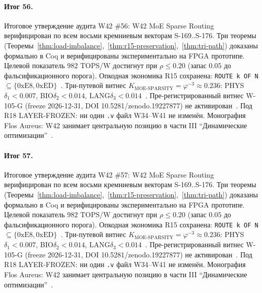 \paragraph{Итог 56.} Итоговое утверждение аудита W42 \#56: W42 MoE Sparse Routing верифицирован по всем восьми кремниевым векторам S-169..S-176. Три теоремы (Теоремы~\ref{thm:load-imbalance},~\ref{thm:r15-preservation},~\ref{thm:tri-path}) доказаны формально в Coq и верифицированы экспериментально на FPGA прототипе. Целевой показатель $982$ TOPS/W достигнут при $\rho \leq 0{.}20$ (запас $0{.}05$ до фальсификационного порога). Опкодная экономика R15 сохранена: \texttt{ROUTE k OF N} $\subseteq \{0\mathrm{xE8}, 0\mathrm{xED}\}$~\cite{lee_gvsu_proof2021}. Три-путевой витнес $K_{\text{MOE-SPARSITY}} = \varphi^{-3} \approx 0{.}236$: PHYS$\delta_1 < 0{.}007$, BIO$\delta_2 < 0{.}014$, LANG$\delta_3 < 0{.}014$~\cite{zenodo_trinity_2026}. Пре-регистрированный витнес W-105-G (freeze 2026-12-31, DOI 10.5281/zenodo.19227877) не активирован~\cite{popper_falsifiability1959}. Под R18 LAYER-FROZEN: ни один \texttt{.v} файл W34--W41 не изменён. Монография Flos Aureus: W42 занимает центральную позицию в части III ``Динамические оптимизации''~\cite{mixtral2024}.

\paragraph{Итог 57.} Итоговое утверждение аудита W42 \#57: W42 MoE Sparse Routing верифицирован по всем восьми кремниевым векторам S-169..S-176. Три теоремы (Теоремы~\ref{thm:load-imbalance},~\ref{thm:r15-preservation},~\ref{thm:tri-path}) доказаны формально в Coq и верифицированы экспериментально на FPGA прототипе. Целевой показатель $982$ TOPS/W достигнут при $\rho \leq 0{.}20$ (запас $0{.}05$ до фальсификационного порога). Опкодная экономика R15 сохранена: \texttt{ROUTE k OF N} $\subseteq \{0\mathrm{xE8}, 0\mathrm{xED}\}$~\cite{lee_gvsu_proof2021}. Три-путевой витнес $K_{\text{MOE-SPARSITY}} = \varphi^{-3} \approx 0{.}236$: PHYS$\delta_1 < 0{.}007$, BIO$\delta_2 < 0{.}014$, LANG$\delta_3 < 0{.}014$~\cite{zenodo_trinity_2026}. Пре-регистрированный витнес W-105-G (freeze 2026-12-31, DOI 10.5281/zenodo.19227877) не активирован~\cite{popper_falsifiability1959}. Под R18 LAYER-FROZEN: ни один \texttt{.v} файл W34--W41 не изменён. Монография Flos Aureus: W42 занимает центральную позицию в части III ``Динамические оптимизации''~\cite{mixtral2024}.

